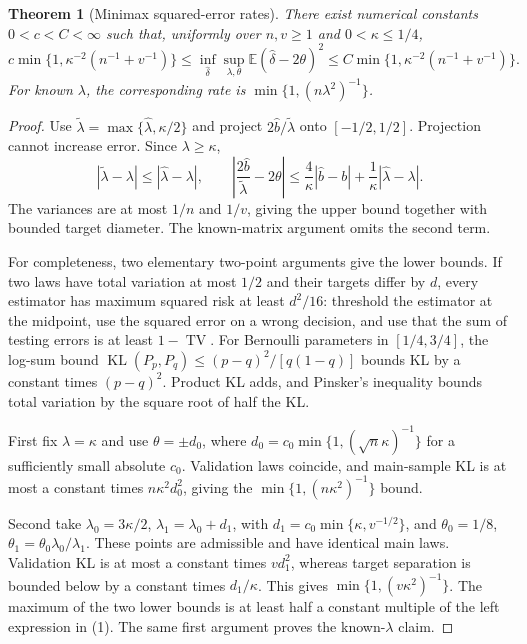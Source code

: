 \documentclass[11pt,a4paper]{article}
\newtheorem{theorem}{Theorem}[section]
\theoremstyle{definition}
\theoremstyle{remark}
\newcommand{\E}{\mathbb{E}}
\begin{document}
\begin{theorem}[Minimax squared-error rates]
There exist numerical constants $0<c<C<\infty$ such that, uniformly over $n,v\geq1$ and $0<\kappa\leq1/4$,
\[
 c\min\{1,\kappa^{-2}(n^{-1}+v^{-1})\}
 \leq\inf_{\widehat\delta}\sup_{\lambda,\theta}\E(\widehat\delta-2\theta)^2
 \leq C\min\{1,\kappa^{-2}(n^{-1}+v^{-1})\}.\tag{1}
\]
For known $\lambda$, the corresponding rate is $\min\{1,(n\lambda^2)^{-1}\}$.
\end{theorem}
\begin{proof}
Use $\widetilde\lambda=\max\{\widehat\lambda,\kappa/2\}$ and project $2\widehat b/\widetilde\lambda$ onto $[-1/2,1/2]$. Projection cannot increase error. Since $\lambda\geq\kappa$,
\[
 |\widetilde\lambda-\lambda|\leq|\widehat\lambda-\lambda|,\qquad
 \left|\frac{2\widehat b}{\widetilde\lambda}-2\theta\right|
 \leq\frac4\kappa|\widehat b-b|+\frac1\kappa|\widehat\lambda-\lambda|.
\]
The variances are at most $1/n$ and $1/v$, giving the upper bound together with bounded target diameter. The known-matrix argument omits the second term.

For completeness, two elementary two-point arguments give the lower bounds. If two laws have total variation at most $1/2$ and their targets differ by $d$, every estimator has maximum squared risk at least $d^2/16$: threshold the estimator at the midpoint, use the squared error on a wrong decision, and use that the sum of testing errors is at least $1-\operatorname{TV}$. For Bernoulli parameters in $[1/4,3/4]$, the log-sum bound $\operatorname{KL}(P_p,P_q)\leq(p-q)^2/[q(1-q)]$ bounds KL by a constant times $(p-q)^2$. Product KL adds, and Pinsker's inequality bounds total variation by the square root of half the KL.

First fix $\lambda=\kappa$ and use $\theta=\pm d_0$, where $d_0=c_0\min\{1,(\sqrt n\kappa)^{-1}\}$ for a sufficiently small absolute $c_0$. Validation laws coincide, and main-sample KL is at most a constant times $n\kappa^2d_0^2$, giving the $\min\{1,(n\kappa^2)^{-1}\}$ bound.

Second take $\lambda_0=3\kappa/2$, $\lambda_1=\lambda_0+d_1$, with $d_1=c_0\min\{\kappa,v^{-1/2}\}$, and $\theta_0=1/8$, $\theta_1=\theta_0\lambda_0/\lambda_1$. These points are admissible and have identical main laws. Validation KL is at most a constant times $vd_1^2$, whereas target separation is bounded below by a constant times $d_1/\kappa$. This gives $\min\{1,(v\kappa^2)^{-1}\}$. The maximum of the two lower bounds is at least half a constant multiple of the left expression in (1). The same first argument proves the known-$\lambda$ claim.
\end{proof}
\end{document}
